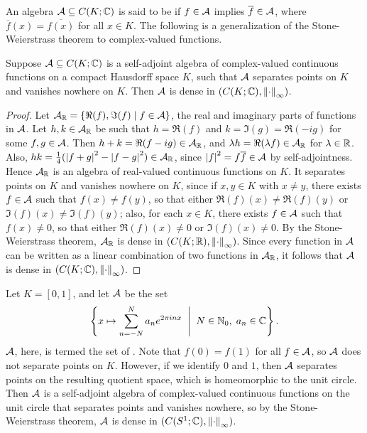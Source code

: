 An algebra $\mathcal{A} \subseteq C(K;\mathbb{C})$ is said to be  if $f \in \mathcal{A}$ implies $\overline{f} \in \mathcal{A}$, where $\overline{f}(x) = \overline{f(x)}$ for all $x \in K$. The following is a generalization of the Stone-Weierstrass theorem to complex-valued functions.

\begin{theorem}
    Suppose $\mathcal{A} \subseteq C(K;\mathbb{C})$ is a self-adjoint algebra of complex-valued continuous functions on a compact Hausdorff space $K$, such that $\mathcal{A}$ separates points on $K$ and vanishes nowhere on $K$. Then $\mathcal{A}$ is dense in $(C(K;\mathbb{C}),\left\lVert\cdot\right\rVert_{\infty})$.
\end{theorem}
\begin{proof}
    Let $\mathcal{A}_{\mathbb{R}} = \{\Re(f), \Im(f) \mid f \in \mathcal{A}\}$, the real and imaginary parts of functions in $\mathcal{A}$. Let $h,k \in \mathcal{A}_{\mathbb{R}}$ be such that $h = \Re(f)$ and $k = \Im(g) = \Re(-ig)$ for some $f,g \in \mathcal{A}$. Then $h+k = \Re(f-ig) \in \mathcal{A}_{\mathbb{R}}$, and $\lambda h = \Re(\lambda f) \in \mathcal{A}_{\mathbb{R}}$ for $\lambda \in \mathbb{R}$. Also, $hk = \frac{1}{4}(\left| f+g \right|^{2}-\left| f-g \right|^{2}) \in \mathcal{A}_{\mathbb{R}}$, since $\left| f \right|^{2} = f\overline{f} \in \mathcal{A}$ by self-adjointness. Hence $\mathcal{A}_{\mathbb{R}}$ is an algebra of real-valued continuous functions on $K$. It separates points on $K$ and vanishes nowhere on $K$, since if $x,y \in K$ with $x \neq y$, there exists $f \in \mathcal{A}$ such that $f(x) \neq f(y)$, so that either $\Re(f)(x) \neq \Re(f)(y)$ or $\Im(f)(x) \neq \Im(f)(y)$; also, for each $x \in K$, there exists $f \in \mathcal{A}$ such that $f(x) \neq 0$, so that either $\Re(f)(x) \neq 0$ or $\Im(f)(x) \neq 0$. By the Stone-Weierstrass theorem, $\mathcal{A}_{\mathbb{R}}$ is dense in $(C(K;\mathbb{R}),\left\lVert\cdot\right\rVert_{\infty})$. Since every function in $\mathcal{A}$ can be written as a linear combination of two functions in $\mathcal{A}_{\mathbb{R}}$, it follows that $\mathcal{A}$ is dense in $(C(K;\mathbb{C}),\left\lVert\cdot\right\rVert_{\infty})$.
\end{proof}

\begin{example}
    Let $K = [0,1]$, and let $\mathcal{A}$ be the set
    \begin{align}
        \left\{ x \mapsto \sum_{n=-N}^{N} a_{n}e^{2\pi i n x} \;\; \Bigg| \;\; N \in \mathbb{N}_{0}, \; a_{n} \in \mathbb{C} \right\}.
    \end{align}
    $\mathcal{A}$, here, is termed the set of . Note that $f(0) = f(1)$ for all $f \in \mathcal{A}$, so $\mathcal{A}$ does not separate points on $K$. However, if we identify $0$ and $1$, then $\mathcal{A}$ separates points on the resulting quotient space, which is homeomorphic to the unit circle. Then $\mathcal{A}$ is a self-adjoint algebra of complex-valued continuous functions on the unit circle that separates points and vanishes nowhere, so by the Stone-Weierstrass theorem, $\mathcal{A}$ is dense in $(C(S^{1};\mathbb{C}),\left\lVert\cdot\right\rVert_{\infty})$.
\end{example}

